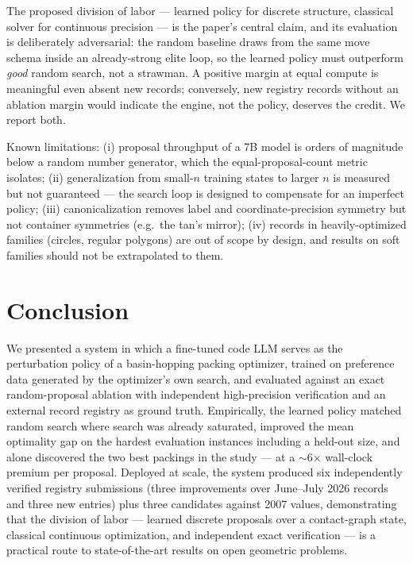 \documentclass[pdflatex,sn-mathphys-num]{sn-jnl}
\theoremstyle{thmstyleone}%
\begin{document}
The proposed division of labor --- learned policy for discrete structure,
classical solver for continuous precision --- is the paper's central claim,
and its evaluation is deliberately adversarial: the random baseline draws
from the same move schema inside an already-strong elite loop, so the
learned policy must outperform \emph{good} random search, not a strawman.
A positive margin at equal compute is meaningful even absent new records;
conversely, new registry records without an ablation margin would indicate
the engine, not the policy, deserves the credit. We report both.

Known limitations: (i) proposal throughput of a 7B model is orders of
magnitude below a random number generator, which the equal-proposal-count
metric isolates; (ii) generalization from small-$n$ training states to
larger $n$ is measured but not guaranteed --- the search loop is designed to
compensate for an imperfect policy; (iii) canonicalization removes label
and coordinate-precision symmetry but not container symmetries
(e.g.\ the tan's mirror); (iv) records in heavily-optimized families
(circles, regular polygons) are out of scope by design, and results on soft
families should not be extrapolated to them.

\section{Conclusion}\label{sec:conclusion}

We presented a system in which a fine-tuned code LLM serves as the
perturbation policy of a basin-hopping packing optimizer, trained on
preference data generated by the optimizer's own search, and evaluated
against an exact random-proposal ablation with independent high-precision
verification and an external record registry as ground truth.
Empirically, the learned policy matched random search where search was
already saturated, improved the mean optimality gap on the hardest
evaluation instances including a held-out size, and alone discovered the
two best packings in the study --- at a $\sim$6$\times$ wall-clock premium
per proposal. Deployed at scale, the system produced six independently
verified registry submissions (three improvements over June--July 2026
records and three new entries) plus three candidates against 2007 values,
demonstrating that the division of labor --- learned discrete proposals
over a contact-graph state, classical continuous optimization, and
independent exact verification --- is a practical route to
state-of-the-art results on open geometric problems.
\end{document}
